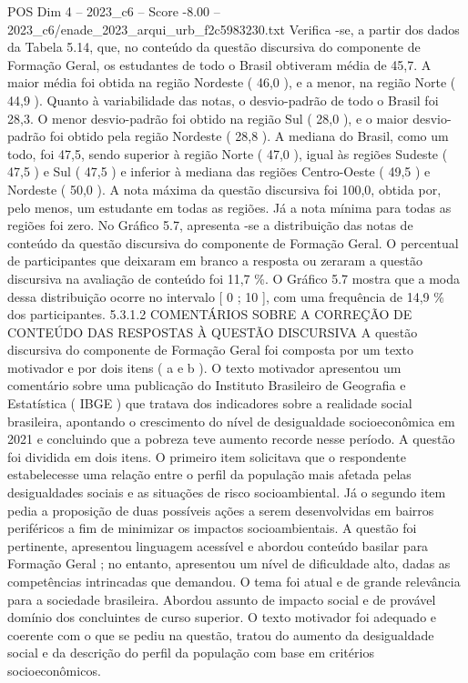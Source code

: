 \begin{textsample}{POS Dim 4 – 2023\_c6 – Score -8.00 – 2023\_c6/enade\_2023\_arqui\_urb\_f2c5983230.txt}
Verifica -se, a partir dos dados da Tabela 5.14, que, no conteúdo da questão discursiva do componente de Formação Geral, os estudantes de todo o Brasil obtiveram média de 45,7.
A maior média foi obtida na região Nordeste ( 46,0 ), e a menor, na região Norte ( 44,9 ).
Quanto à variabilidade das notas, o desvio-padrão de todo o Brasil foi 28,3.
O menor desvio-padrão foi obtido na região Sul ( 28,0 ), e o maior desvio-padrão foi obtido pela região Nordeste ( 28,8 ).
A mediana do Brasil, como um todo, foi 47,5, sendo superior à região Norte ( 47,0 ), igual às regiões Sudeste ( 47,5 ) e Sul ( 47,5 ) e inferior à mediana das regiões Centro-Oeste ( 49,5 ) e Nordeste ( 50,0 ).
A nota máxima da questão discursiva foi 100,0, obtida por, pelo menos, um estudante em todas as regiões.
Já a nota mínima para todas as regiões foi zero.
No Gráfico 5.7, apresenta -se a distribuição das notas de conteúdo da questão discursiva do componente de Formação Geral.
O percentual de participantes que deixaram em branco a resposta ou zeraram a questão discursiva na avaliação de conteúdo foi 11,7 \%.
O Gráfico 5.7 mostra que a moda dessa distribuição ocorre no intervalo [ 0 ; 10 ], com uma frequência de 14,9 \% dos participantes. 5.3.1.2 COMENTÁRIOS SOBRE A CORREÇÃO DE CONTEÚDO DAS RESPOSTAS À QUESTÃO DISCURSIVA A questão discursiva do componente de Formação Geral foi composta por um texto motivador e por dois itens ( a e b ).
O texto motivador apresentou um comentário sobre uma publicação do Instituto Brasileiro de Geografia e Estatística ( IBGE ) que tratava dos indicadores sobre a realidade social brasileira, apontando o crescimento do nível de desigualdade socioeconômica em 2021 e concluindo que a pobreza teve aumento recorde nesse período.
A questão foi dividida em dois itens.
O primeiro item solicitava que o respondente estabelecesse uma relação entre o perfil da população mais afetada pelas desigualdades sociais e as situações de risco socioambiental.
Já o segundo item pedia a proposição de duas possíveis ações a serem desenvolvidas em bairros periféricos a fim de minimizar os impactos socioambientais.
A questão foi pertinente, apresentou linguagem acessível e abordou conteúdo basilar para Formação Geral ; no entanto, apresentou um nível de dificuldade alto, dadas as competências intrincadas que demandou.
O tema foi atual e de grande relevância para a sociedade brasileira.
Abordou assunto de impacto social e de provável domínio dos concluintes de curso superior.
O texto motivador foi adequado e coerente com o que se pediu na questão, tratou do aumento da desigualdade social e da descrição do perfil da população com base em critérios socioeconômicos.

\end{textsample}
